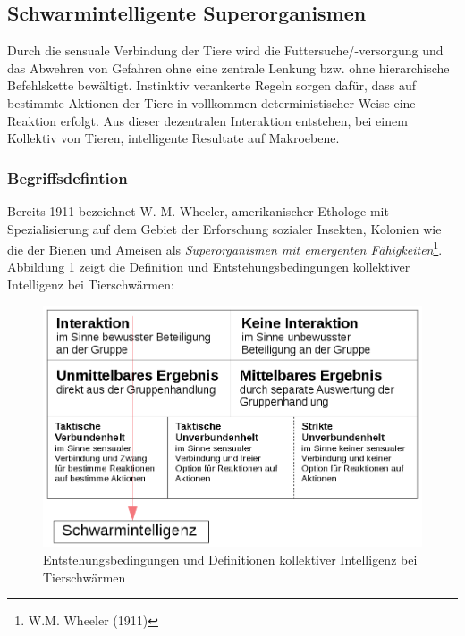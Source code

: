 \documentclass[a4paper, 11pt]{article}
\begin{document}
\subsection{Schwarmintelligente Superorganismen}
Durch die sensuale Verbindung der Tiere wird die Futtersuche/-versorgung und das Abwehren von Gefahren ohne eine zentrale Lenkung bzw. ohne hierarchische Befehlskette bewältigt. Instinktiv verankerte Regeln sorgen dafür, dass auf bestimmte Aktionen der Tiere in vollkommen deterministischer Weise eine Reaktion erfolgt. Aus dieser dezentralen Interaktion entstehen, bei einem Kollektiv von Tieren, intelligente Resultate auf Makroebene.
\subsubsection{Begriffsdefintion}
Bereits 1911 bezeichnet W. M. Wheeler, amerikanischer Ethologe mit Spezialisierung auf dem Gebiet der Erforschung sozialer Insekten, Kolonien wie die der Bienen und Ameisen als \textit{Superorganismen mit emergenten Fähigkeiten}\footnote{W.M. Wheeler (1911)}. Abbildung 1 zeigt die Definition und Entstehungsbedingungen kollektiver Intelligenz bei Tierschwärmen:\newline
\begin{figure}[h]
	\begin{center}
	\includegraphics[width=1\textwidth]{schwarmintelligenz}
	\end{center}
	\hspace{1in}\parbox{4in}{\caption[Entstehungsbedingungen und Definitionen kollektiver Intelligenz bei Tierschwärmen]{Entstehungsbedingungen und Definitionen kollektiver Intelligenz bei Tierschwärmen\footnotemark}}
\end{figure}
\end{document}
